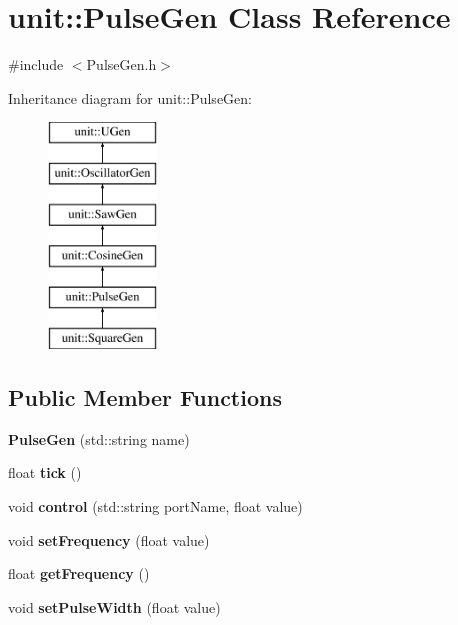 \hypertarget{classunit_1_1PulseGen}{\section{unit\-:\-:Pulse\-Gen Class Reference}
\label{classunit_1_1PulseGen}
}


{\ttfamily \#include $<$Pulse\-Gen.\-h$>$}

Inheritance diagram for unit\-:\-:Pulse\-Gen\-:\begin{figure}[H]
\begin{center}
\leavevmode
\includegraphics[height=6.000000cm]{classunit_1_1PulseGen}
\end{center}
\end{figure}
\subsection*{Public Member Functions}
\begin{DoxyCompactItemize}
\item 
\hypertarget{classunit_1_1PulseGen_a466bdb3fcc244e66f2c29a9a517d4b85}{{\bfseries Pulse\-Gen} (std\-::string name)}\label{classunit_1_1PulseGen_a466bdb3fcc244e66f2c29a9a517d4b85}

\item 
\hypertarget{classunit_1_1PulseGen_a8b09b8d3cf11eb6a315bdd9b6347227d}{float {\bfseries tick} ()}\label{classunit_1_1PulseGen_a8b09b8d3cf11eb6a315bdd9b6347227d}

\item 
\hypertarget{classunit_1_1PulseGen_a581c649900c094728f4b587fb36c4f56}{void {\bfseries control} (std\-::string port\-Name, float value)}\label{classunit_1_1PulseGen_a581c649900c094728f4b587fb36c4f56}

\item 
\hypertarget{classunit_1_1PulseGen_af4a027e50251040d914cdf18a87d7a73}{void {\bfseries set\-Frequency} (float value)}\label{classunit_1_1PulseGen_af4a027e50251040d914cdf18a87d7a73}

\item 
\hypertarget{classunit_1_1PulseGen_aa4b24157a5f5a95d1ccf0cf639598b8f}{float {\bfseries get\-Frequency} ()}\label{classunit_1_1PulseGen_aa4b24157a5f5a95d1ccf0cf639598b8f}

\item 
\hypertarget{classunit_1_1PulseGen_a9be5874432ee5e966542bc1b568faa61}{void {\bfseries set\-Pulse\-Width} (float value)}\label{classunit_1_1PulseGen_a9be5874432ee5e966542bc1b568faa61}

\end{DoxyCompactItemize}
